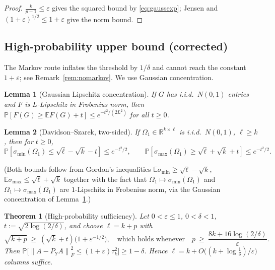 \documentclass{amsart}
\newtheorem{theorem}{Theorem}
\newtheorem{lemma}{Lemma}
\theoremstyle{definition}
\newcommand{\R}{\mathbb{R}}
\newcommand{\Frob}[1]{\left\lVert #1\right\rVert_F}
\newcommand{\E}{\mathbb{E}}
\newcommand{\Prob}{\mathbb{P}}
\begin{document}
\begin{proof}
$\frac{k}{p-1}\le\varepsilon$ gives the squared bound by \eqref{eq:gaussexp};
Jensen and $(1+\varepsilon)^{1/2}\le1+\varepsilon$ give the norm bound.
\end{proof}

\subsection{High-probability upper bound (corrected)}\label{sec:hp}

The Markov route inflates the threshold by $1/\delta$ and cannot reach the
constant $1+\varepsilon$; see Remark~\ref{rem:nomarkov}. We use Gaussian
concentration.

\begin{lemma}[Gaussian Lipschitz concentration]\label{lem:lip}
If $G$ has i.i.d.\ $N(0,1)$ entries and $F$ is $L$-Lipschitz in Frobenius norm,
then $\Prob[F(G)\ge\E F(G)+t]\le e^{-t^2/(2L^2)}$ for all $t\ge0$.
\end{lemma}

\begin{lemma}[Davidson--Szarek, two-sided]\label{lem:smin}
If $\Omega_1\in\R^{k\times\ell}$ is i.i.d.\ $N(0,1)$, $\ell\ge k$, then for
$t\ge0$,
\[
\Prob[\sigma_{\min}(\Omega_1)\le\sqrt\ell-\sqrt k-t]\le e^{-t^2/2},\qquad
\Prob[\sigma_{\max}(\Omega_1)\ge\sqrt\ell+\sqrt k+t]\le e^{-t^2/2}.
\]
\end{lemma}

(Both bounds follow from Gordon's inequalities
$\E\sigma_{\min}\ge\sqrt\ell-\sqrt k$, $\E\sigma_{\max}\le\sqrt\ell+\sqrt k$
together with the fact that $\Omega_1\mapsto\sigma_{\min}(\Omega_1)$ and
$\Omega_1\mapsto\sigma_{\max}(\Omega_1)$ are $1$-Lipschitz in Frobenius norm,
via the Gaussian concentration of Lemma~\ref{lem:lip}.)

\begin{theorem}[High-probability sufficiency]\label{thm:hp}
Let $0<\varepsilon\le1$, $0<\delta<1$, $t:=\sqrt{2\log(2/\delta)}$, and choose
$\ell=k+p$ with
\begin{equation}\label{eq:hpthresh}
\sqrt{k+p}\ \ge\ (\sqrt k+t)\big(1+\varepsilon^{-1/2}\big),
\quad\text{which holds whenever}\quad
p\ \ge\ \frac{8k+16\log(2/\delta)}{\varepsilon}.
\end{equation}
Then $\Prob\big[\Frob{A-P_YA}^2\le(1+\varepsilon)\tau_k^2\big]\ge1-\delta$.
Hence $\ell=k+O\big((k+\log\tfrac1\delta)/\varepsilon\big)$ columns suffice.
\end{theorem}
\end{document}
